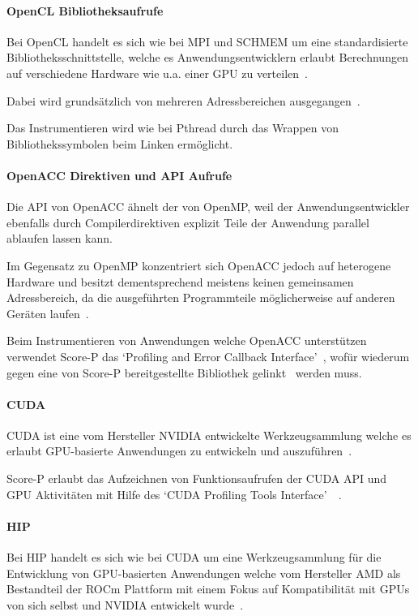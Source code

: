 \documentclass[german,proseminar,hyperref,utf8,lof]{zihpub}
\begin{document}
    \paragraph{OpenCL Bibliotheksaufrufe}
    Bei OpenCL handelt es sich wie bei MPI und SCHMEM um eine standardisierte Bibliotheksschnittstelle,
    welche es Anwendungsentwicklern erlaubt Berechnungen auf verschiedene Hardware wie u.a. einer GPU
    zu verteilen~.
    
    Dabei wird grundsätzlich von mehreren Adressbereichen ausgegangen~.

    Das Instrumentieren wird wie bei Pthread durch das Wrappen von Bibliothekssymbolen beim
    Linken ermöglicht.

    \paragraph{OpenACC Direktiven und API Aufrufe}
    Die API von OpenACC ähnelt der von OpenMP, weil der Anwendungsentwickler ebenfalls durch
    Compilerdirektiven explizit Teile der Anwendung parallel ablaufen lassen kann.

    Im Gegensatz zu OpenMP konzentriert sich OpenACC jedoch auf heterogene Hardware und besitzt
    dementsprechend meistens keinen gemeinsamen Adressbereich, da die ausgeführten Programmteile
    möglicherweise auf anderen Geräten laufen~.

    Beim Instrumentieren von Anwendungen welche OpenACC unterstützen verwendet Score-P das
    `Profiling and Error Callback Interface'~, wofür wiederum gegen eine
    von Score-P bereitgestellte Bibliothek gelinkt~
    werden muss.

    \paragraph{CUDA}
    CUDA ist eine vom Hersteller NVIDIA entwickelte Werkzeugsammlung welche es erlaubt GPU-basierte
    Anwendungen zu entwickeln und auszuführen~.

    Score-P erlaubt das Aufzeichnen von Funktionsaufrufen der CUDA API und GPU Aktivitäten mit Hilfe des
    `CUDA Profiling Tools Interface'~~.

    \paragraph{HIP}
    Bei HIP handelt es sich wie bei CUDA um eine Werkzeugsammlung für die Entwicklung von GPU-basierten
    Anwendungen welche vom Hersteller AMD als Bestandteil der ROCm Plattform mit einem Fokus auf
    Kompatibilität mit GPUs von sich selbst und NVIDIA entwickelt wurde~.
\end{document}
